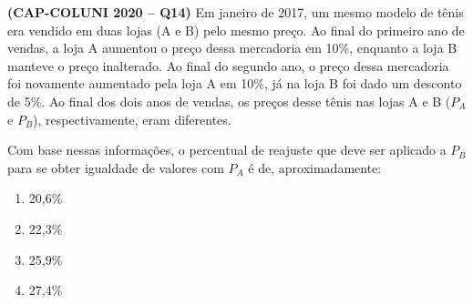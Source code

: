 \textbf{(CAP-COLUNI 2020 -- Q14)} Em janeiro de 2017, um mesmo modelo de tênis era vendido em duas lojas (A e B) pelo mesmo preço. Ao final do primeiro ano de vendas, a loja A aumentou o preço dessa mercadoria em 10\%, enquanto a loja B manteve o preço inalterado. Ao final do segundo ano, o preço dessa mercadoria foi novamente aumentado pela loja A em 10\%, já na loja B foi dado um desconto de 5\%. Ao final dos dois anos de vendas, os preços desse tênis nas lojas A e B ($P_A$ e $P_B$), respectivamente, eram diferentes.

Com base nessas informações, o percentual de reajuste que deve ser aplicado a $P_B$ para se obter igualdade de valores com $P_A$ é de, aproximadamente:

\begin{enumerate}
	\item 20,6\%
	\item 22,3\%
	\item 25,9\%
	\item 27,4\%
\end{enumerate}
